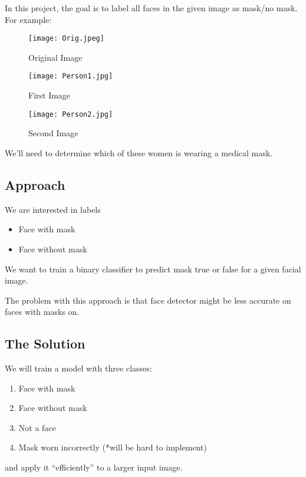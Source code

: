 In this project, the goal is to label all faces in the given image as mask/no mask. For example:

\begin{figure}[H]
    \centering
    \texttt{[image: Orig.jpeg]}
    \caption{Original Image}
    \label{fig:Orig}
\end{figure}

\begin{figure}[H]
    \centering
    \texttt{[image: Person1.jpg]}
    \caption{First Image}
    \label{fig:First}
\end{figure}

\begin{figure}[H]
    \centering
    \texttt{[image: Person2.jpg]}
    \caption{Second Image}
    \label{fig:Second}
\end{figure}

We'll need to determine which of these women is wearing a medical mask.

\subsection{Approach}
We are interested in labels
\begin{itemize}
    \item Face with mask
    \item Face without mask
\end{itemize}

We want to train a binary classifier to predict mask true or false for a given facial image.


The problem with this approach is that face detector might be less accurate on faces with masks on.

\subsection{The Solution}
We will train a model with three classes:
\begin{enumerate}
    \item Face with mask
    \item Face without mask
    \item Not a face
    \item Mask worn incorrectly (*will be hard to implement)
\end{enumerate}

and apply it “efficiently” to a larger input image.

